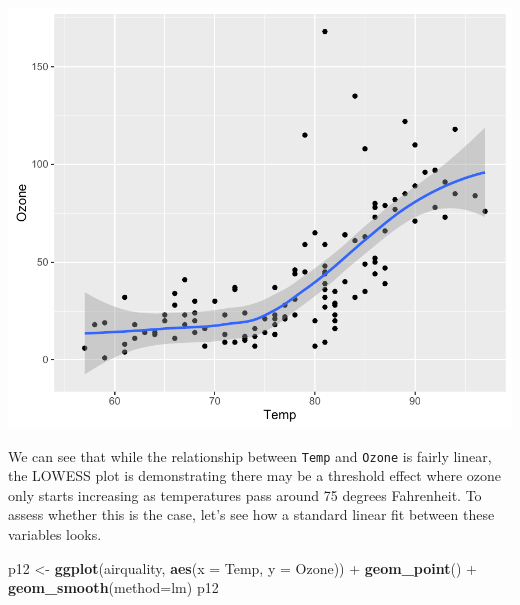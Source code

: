 \documentclass[]{article}
\newenvironment{Shaded}{\begin{snugshade}}{\end{snugshade}}
\newcommand{\KeywordTok}[1]{\textcolor[rgb]{0.13,0.29,0.53}{\textbf{{#1}}}}
\newcommand{\DataTypeTok}[1]{\textcolor[rgb]{0.13,0.29,0.53}{{#1}}}
\newcommand{\StringTok}[1]{\textcolor[rgb]{0.31,0.60,0.02}{{#1}}}
\newcommand{\NormalTok}[1]{{#1}}
\begin{document}
\begin{center}\includegraphics{12_Lowess_Plots_pdf/lowess_1-1} \end{center}

We can see that while the relationship between \texttt{Temp} and
\texttt{Ozone} is fairly linear, the LOWESS plot is demonstrating there
may be a threshold effect where ozone only starts increasing as
temperatures pass around 75 degrees Fahrenheit. To assess whether this
is the case, let's see how a standard linear fit between these variables
looks.

\begin{Shaded}
\begin{Highlighting}[]
\NormalTok{p12 <-}\StringTok{ }\KeywordTok{ggplot}\NormalTok{(airquality, }\KeywordTok{aes}\NormalTok{(}\DataTypeTok{x =} \NormalTok{Temp, }\DataTypeTok{y =} \NormalTok{Ozone)) +}\StringTok{ }
\StringTok{  }\KeywordTok{geom_point}\NormalTok{() +}\StringTok{ }
\StringTok{  }\KeywordTok{geom_smooth}\NormalTok{(}\DataTypeTok{method=}\NormalTok{lm)}
\NormalTok{p12}
\end{Highlighting}
\end{Shaded}
\end{document}
